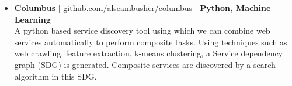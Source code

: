 \begin{itemize}
 \item \textbf{Columbus} | \href{http://github.com/alseambusher/columbus}{github.com/alseambusher/columbus} | \textbf{Python, Machine Learning}\\
 A python based service discovery tool using which we can combine web services automatically to perform composite tasks. Using techniques such as web crawling, feature extraction, k-means clustering, a Service dependency graph (SDG) is generated. Composite services are discovered by a search algorithm in this SDG.


\end{itemize}
\vspace{5pt}
